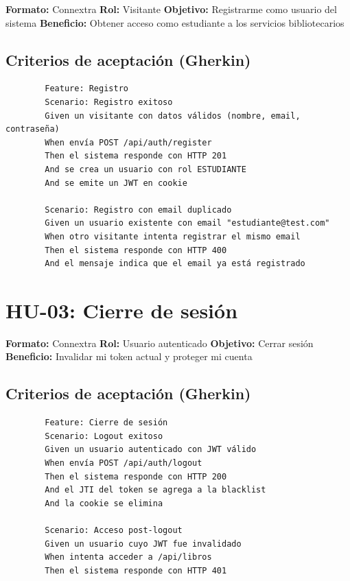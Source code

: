 \documentclass[
11pt,
a4paper,
]{report}
\begin{document}
	\textbf{Formato:} Connextra
	\textbf{Rol:} Visitante
	\textbf{Objetivo:} Registrarme como usuario del sistema
	\textbf{Beneficio:} Obtener acceso como estudiante a los servicios bibliotecarios
	
	\hypertarget{criterios-de-aceptaciuxf3n-gherkin-1}{%
		\subsection{Criterios de aceptación (Gherkin)}\label{criterios-de-aceptaciuxf3n-gherkin-1}}
	
	\begin{lstlisting}
		Feature: Registro
		Scenario: Registro exitoso
		Given un visitante con datos válidos (nombre, email, contraseña)
		When envía POST /api/auth/register
		Then el sistema responde con HTTP 201
		And se crea un usuario con rol ESTUDIANTE
		And se emite un JWT en cookie
		
		Scenario: Registro con email duplicado
		Given un usuario existente con email "estudiante@test.com"
		When otro visitante intenta registrar el mismo email
		Then el sistema responde con HTTP 400
		And el mensaje indica que el email ya está registrado
	\end{lstlisting}
	
	\hypertarget{hu-03-cierre-de-sesiuxf3n}{%
		\section{HU-03: Cierre de sesión}\label{hu-03-cierre-de-sesiuxf3n}}
	
	\textbf{Formato:} Connextra
	\textbf{Rol:} Usuario autenticado
	\textbf{Objetivo:} Cerrar sesión
	\textbf{Beneficio:} Invalidar mi token actual y proteger mi cuenta
	
	\hypertarget{criterios-de-aceptaciuxf3n-gherkin-2}{%
		\subsection{Criterios de aceptación (Gherkin)}\label{criterios-de-aceptaciuxf3n-gherkin-2}}
	
	\begin{lstlisting}
		Feature: Cierre de sesión
		Scenario: Logout exitoso
		Given un usuario autenticado con JWT válido
		When envía POST /api/auth/logout
		Then el sistema responde con HTTP 200
		And el JTI del token se agrega a la blacklist
		And la cookie se elimina
		
		Scenario: Acceso post-logout
		Given un usuario cuyo JWT fue invalidado
		When intenta acceder a /api/libros
		Then el sistema responde con HTTP 401
	\end{lstlisting}
	
\end{document}
